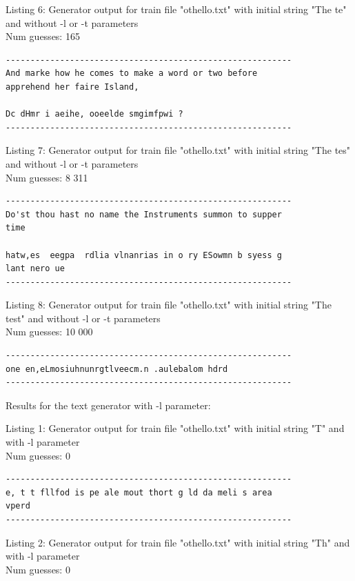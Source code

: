 \documentclass{article}
\begin{document}
Listing 6: Generator output for train file "othello.txt" with initial string "The te" and without -l or -t parameters
\\Num guesses: 165

\begin{lstlisting}
----------------------------------------------------------
And marke how he comes to make a word or two before 
apprehend her faire Island,

Dc dHmr i aeihe, ooeelde smgimfpwi ? 
----------------------------------------------------------
\end{lstlisting}

Listing 7: Generator output for train file "othello.txt" with initial string "The tes" and without -l or -t parameters
\\Num guesses: 8 311

\begin{lstlisting}
----------------------------------------------------------
Do'st thou hast no name the Instruments summon to supper 
time

hatw,es  eegpa  rdlia vlnanrias in o ry ESowmn b syess g 
lant nero ue 
----------------------------------------------------------
\end{lstlisting}

Listing 8: Generator output for train file "othello.txt" with initial string "The test" and without -l or -t parameters
\\Num guesses: 10 000

\begin{lstlisting}
----------------------------------------------------------
one en,eLmosiuhnunrgtlveecm.n .aulebalom hdrd
----------------------------------------------------------
\end{lstlisting}



Results for the text generator with -l parameter:


\hfill

Listing 1: Generator output for train file "othello.txt" with initial string "T" and with -l parameter
\\Num guesses: 0

\begin{lstlisting}
----------------------------------------------------------
e, t t fllfod is pe ale mout thort g ld da meli s area 
vperd
----------------------------------------------------------
\end{lstlisting}

Listing 2: Generator output for train file "othello.txt" with initial string "Th" and with -l parameter
\\Num guesses: 0
\end{document}
